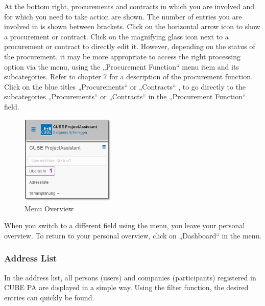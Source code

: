 At the bottom right, procurements and contracts  in which you are involved and for which you need to take action are shown. The number of entries you are involved in is shown between brackets. Click on the horizontal arrow icon to show a procurement or contract. Click on the magnifying glass icon next to a procurement or contract to directly edit it. However, depending on the status of the procurement, it may be more appropriate to access the right processing option via the menu, using the „Procurement Function“ menu item and its subcategories. Refer to chapter 7 for a description of the procurement function. Click on the blue titles „Procurements“ or „Contracts“ , to go directly to the subcategories „Procurements“ or „Contracts“ in the „Procurement Function“ field.

\vspace{\baselineskip}

\begin{figure}
  \vspace{-30pt}
  \begin{center}
    \includegraphics[width=0.4\textwidth]{../chapters/01_Einfuehrung/pictures/1-3-2_MenuepunktUebersicht.jpg}
  \end{center}
  \vspace{-20pt}
  \caption{Menu Overview}
  \vspace{-10pt}
\end{figure}
When you switch to a different field using the menu, you leave your personal overview. To return to your personal overview, click on „Dashboard“  in the menu.

\pagebreak
\subsubsection{Address List} %

In the address list, all persons (users) and companies (participants) registered in CUBE PA are displayed in a simple way. Using the filter function, the desired entries can quickly be found.

